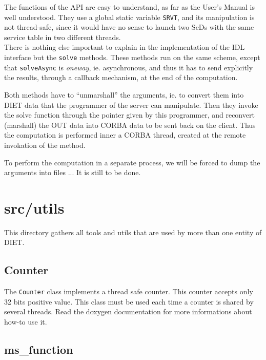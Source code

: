 {  The functions of the API are easy to understand, as far as the User's Manual is
  well understood. They use a global static variable \texttt{SRVT}, and its
  manipulation is not thread-safe, since it would have no sense to launch two SeDs
  with the same service table in two different threads.
  \\

  There is nothing else important to explain in the implementation of the IDL
  interface but the \texttt{solve} methods. These methods run on the same
  scheme, except that \texttt{solveAsync} is \textit{oneway}, ie. asynchronous,
  and thus it has to send explicitly the results, through a callback mechanism, at
  the end of the computation.


  Both methods have to ``unmarshall'' the arguments, ie. to convert them into DIET
  data that the programmer of the server can manipulate. Then they invoke the
  solve function through the pointer given by this programmer, and reconvert
  (marshall) the OUT data into CORBA data to be sent back on the client. Thus the
  computation is performed inner a CORBA thread, created at the remote invokation
  of the method.

  To perform the computation in a separate process, we will be forced to dump the
  arguments into files ... It is still to be done.


  \section{\textsf{src/utils}}
  \label{s:utils}

  This directory gathers all tools and utils that are used by more than one
  entity of DIET.


  \subsection{\textsf{Counter}}

  The \texttt{Counter} class implements a thread safe counter. This counter
  accepts only 32 bits positive value. This class must be used each time a
  counter is shared by several threads. Read the doxygen documentation for more
  informations about how-to use it.

  \subsection{\textsf{ms\_function}}

}
